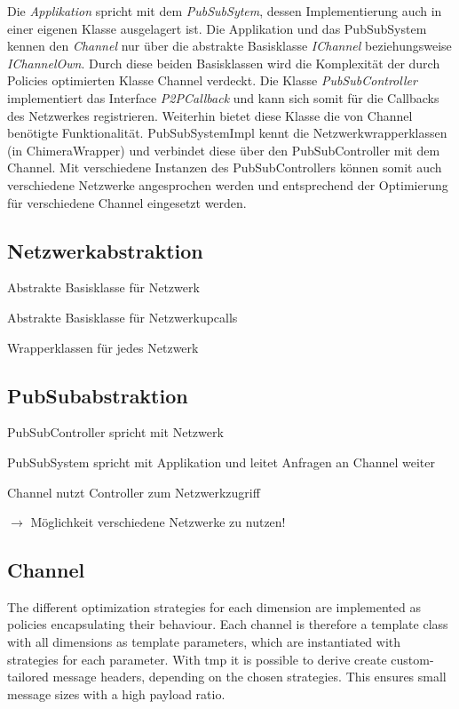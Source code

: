 Die \emph{Applikation} spricht mit dem \emph{PubSubSytem}, dessen Implementierung auch in einer eigenen Klasse ausgelagert ist. Die Applikation und das PubSubSystem kennen den \emph{Channel} nur über die abstrakte Basisklasse \emph{IChannel} beziehungsweise \emph{IChannelOwn}. Durch diese beiden Basisklassen wird die Komplexität der durch Policies optimierten Klasse Channel verdeckt. Die Klasse \emph{PubSubController} implementiert das Interface \emph{P2PCallback} und kann sich somit für die Callbacks des Netzwerkes registrieren. Weiterhin bietet diese Klasse die von Channel benötigte Funktionalität. PubSubSystemImpl kennt die Netzwerkwrapperklassen (in  ChimeraWrapper) und verbindet diese über den PubSubController mit dem Channel. Mit verschiedene Instanzen des PubSubControllers können somit auch verschiedene Netzwerke angesprochen werden und entsprechend der Optimierung für verschiedene Channel eingesetzt werden.

\subsection{Netzwerkabstraktion}
\begin{itemize*}
\item Abstrakte Basisklasse für Netzwerk
\item Abstrakte Basisklasse für Netzwerkupcalls
\item Wrapperklassen für jedes Netzwerk
\end{itemize*}


\subsection{PubSubabstraktion}
\begin{itemize*}
\item PubSubController spricht mit Netzwerk
\item PubSubSystem spricht mit Applikation und leitet Anfragen an Channel weiter
\item Channel nutzt Controller zum Netzwerkzugriff
\item $\rightarrow$ Möglichkeit verschiedene Netzwerke zu nutzen!
\end{itemize*}

\subsection{Channel}
The different optimization strategies for each dimension are implemented as policies encapsulating their behaviour. Each channel is therefore a template class with all dimensions as template parameters, which are instantiated with strategies for each parameter. With \ac{tmp} it is possible to derive create custom-tailored message headers, depending on the chosen strategies. This ensures small message sizes with a high payload ratio.

